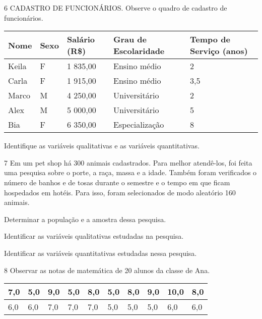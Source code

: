 
\num{6} CADASTRO DE FUNCIONÁRIOS. Observe o quadro de cadastro de
funcionários.

\begin{longtable}[]{@{}lllll@{}}
\toprule
\textbf{Nome} & \textbf{Sexo} & \textbf{Salário (R\$)} & \textbf{Grau de
Escolaridade} & \textbf{Tempo de Serviço (anos)}\tabularnewline
\midrule
\endhead
Keila & F & 1 835,00 & Ensino médio & 2\tabularnewline
Carla & F & 1 915,00 & Ensino médio & 3,5\tabularnewline
Marco & M & 4 250,00 & Universitário & 2\tabularnewline
Alex & M & 5 000,00 & Universitário & 5\tabularnewline
Bia & F & 6 350,00 & Especialização & 8\tabularnewline
\bottomrule
\end{longtable}

Identifique as variáveis qualitativas e as variáveis quantitativas.



\num{7} Em um pet shop há 300 animais cadastrados. Para melhor atendê-los,
foi feita uma pesquisa sobre o porte, a raça, massa e a idade. Também
foram verificados o número de banhos e de tosas durante o semestre e o
tempo em que ficam hospedados em hotéis. Para isso, foram selecionados
de modo aleatório 160 animais.

\begin{escolha}
\item
  Determinar a população e a amostra dessa pesquisa.


\item
  Identificar as variáveis qualitativas estudadas na pesquisa.


\item
  Identificar as variáveis quantitativas estudadas nessa pesquisa.

\end{escolha}


\num{8} Observar as notas de matemática de 20 alunos da classe de Ana.

\begin{longtable}[]{@{}llllllllll@{}}
\toprule
7,0 & 5,0 & 9,0 & 5,0 & 8,0 & 5,0 & 8,0 & 9,0 & 10,0 &
8,0\tabularnewline
\midrule
\endhead
6,0 & 6,0 & 7,0 & 7,0 & 7,0 & 5,0 & 5,0 & 5,0 & 6,0 & 6,0\tabularnewline
\bottomrule
\end{longtable}

